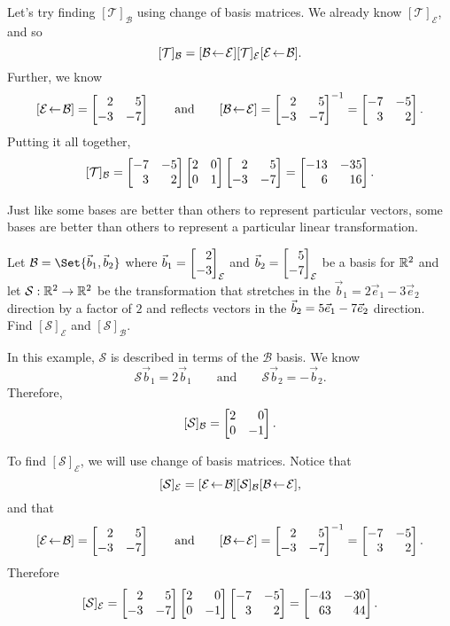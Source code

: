 \begin{example}
	Let's try finding $[\mathcal T]_{\mathcal B}$ using change of basis matrices. We already know $[\mathcal T]_{\mathcal E}$, and so
	\[
		[\mathcal T]_{\mathcal B} = \BasisChange{\mathcal E}{\mathcal B}[\mathcal T]_{\mathcal E}\BasisChange{\mathcal B}{\mathcal E}.
	\]
	Further, we know
	\[
		\BasisChange{\mathcal B}{\mathcal E}=\mat{2&5\\-3&-7}\qquad \text{and}\qquad
		\BasisChange{\mathcal E}{\mathcal B}=\mat{2&5\\-3&-7}^{-1}=\mat{-7&-5\\3&2}.
	\]
	Putting it all together,
	\[
		[\mathcal T]_{\mathcal B}=\mat{-7&-5\\3&2}\mat{2&0\\0&1}\mat{2&5\\-3&-7} = \mat{-13&-35\\6&16}.
	\]

\end{example}


Just like some bases are better than others to represent particular vectors, some bases are better than others
to represent a particular linear transformation.

\begin{example}
	Let $\mathcal B=\Set{\vec b_1,\vec b_2}$ where $\vec b_1=\mat{2\\-3}_{\mathcal E}$ and $\vec b_2=\mat{5\\-7}_{\mathcal E}$
	be a basis for $\R^2$ and let $\mathcal S:\R^2\to\R^2$ be the transformation that stretches in the $\vec b_1=2\vec e_1-3\vec e_2$ direction 
	by a factor of $2$ and reflects vectors in the $\vec b_2=5\xhat-7\yhat$ direction. 
	Find $[\mathcal S]_{\mathcal E}$ and $[\mathcal S]_{\mathcal B}$.

	In this example, $\mathcal S$ is described in terms of the $\mathcal B$ basis. We know
	\[
		\mathcal S\vec b_1=2\vec b_1\qquad\text{and}\qquad\mathcal S\vec b_2=-\vec b_2.
	\]
	Therefore,
	\[
		[\mathcal S]_{\mathcal B}=\mat{2&0\\0&-1}.
	\]

	To find $[\mathcal S]_{\mathcal E}$, we will use change of basis matrices. Notice that
	\[
		[\mathcal S]_{\mathcal E} = \BasisChange{\mathcal B}{\mathcal E}[\mathcal S]_{\mathcal B}\BasisChange{\mathcal E}{\mathcal B},
	\]
	and that
	\[
		\BasisChange{\mathcal B}{\mathcal E}=\mat{2&5\\-3&-7}\qquad \text{and}\qquad
		\BasisChange{\mathcal E}{\mathcal B}=\mat{2&5\\-3&-7}^{-1}=\mat{-7&-5\\3&2}.
	\]
	Therefore
	\[
		[\mathcal S]_{\mathcal E} = \mat{2&5\\-3&-7}\mat{2&0\\0&-1}\mat{-7&-5\\3&2}=\mat{-43&-30\\63&44}.
	\]
\end{example}

